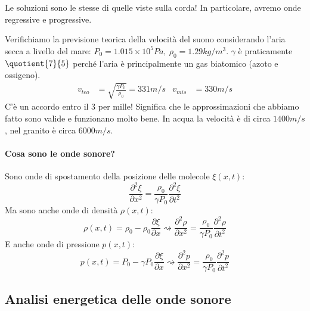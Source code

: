 Le soluzioni sono le stesse di quelle viste sulla corda! In particolare, avremo onde regressive e progressive.
\begin{eg}
	Verifichiamo la previsione teorica della velocità del suono considerando l'aria secca a livello del mare: \(P_0 = 1.015 \times 10^5 \unit{Pa},\ \rho _0 = 1.29 \unit{kg/ m^3 }\). \(\gamma \) è praticamente \(\quotient{7}{5}\) perché l'aria è principalmente un gas biatomico (azoto e ossigeno).
	\begin{align}
		v_{teo} &= \sqrt{\frac{\gamma P_0}{\rho _0}} = 331 \unit{m/s} & v_{mis} &= 330 \unit{m / s} 
	\end{align}
	C'è un accordo entro il 3 per mille! Significa che le approssimazioni che abbiamo fatto sono valide e funzionano molto bene. In acqua la velocità è di circa \(1400 \unit{m / s}\), nel granito è circa \(6000 \unit{m /s}\).
\end{eg}

\paragraph{Cosa sono le onde sonore?}
Sono onde di spostamento della posizione delle molecole \(\xi (x,t)\):
\begin{equation}
	\frac{\partial^{2}  \xi }{\partial x^{2} } = \frac{\rho _0}{\gamma P_0} \frac{\partial ^{2} \xi }{\partial t ^{2} }  
\end{equation}
Ma sono anche onde di densità \(\rho (x,t)\):
\begin{equation}
	\rho (x,t) = \rho _0 - \rho _0 \frac{\partial \xi }{\partial x} \rightsquigarrow \frac{\partial ^{2} \rho }{\partial x^{2} } = \frac{\rho _0}{\gamma P_0} \frac{\partial ^{2} \rho }{\partial t ^{2} }  
\end{equation}
E anche onde di pressione \(p(x,t)\):
\begin{equation}
	p(x,t) = P_0 - \gamma P_0 \frac{\partial \xi }{\partial x} \rightsquigarrow \frac{\partial ^{2} p}{\partial x^{2} } = \frac{\rho _0}{\gamma P_0} \frac{\partial ^{2} p}{\partial t ^{2} }  
\end{equation}

\subsection{Analisi energetica delle onde sonore}

